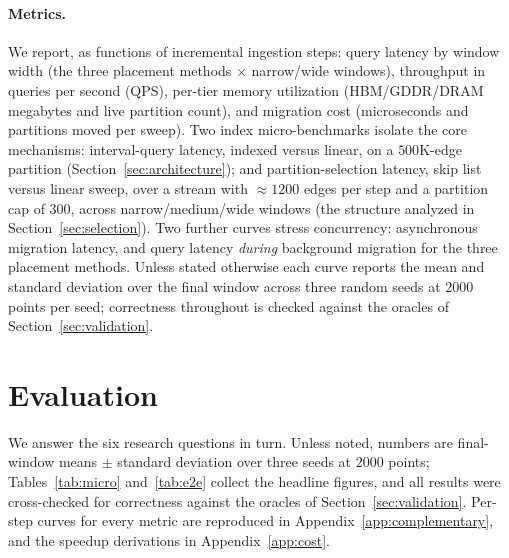 \documentclass[10pt]{article}
\theoremstyle{definition}
\begin{document}
\paragraph{Metrics.}
We report, as functions of incremental ingestion steps: query latency by window
width (the three placement methods $\times$ narrow/wide windows), throughput in
queries per second (QPS), per-tier memory utilization (HBM/GDDR/DRAM megabytes and
live partition count), and migration cost (microseconds and partitions moved per
sweep). Two index micro-benchmarks isolate the core mechanisms: interval-query
latency, indexed versus linear, on a $500$K-edge partition
(Section~\ref{sec:architecture}); and partition-selection latency, skip list versus
linear sweep, over a stream with $\approx 1200$ edges per step and a partition cap
of $300$, across narrow/medium/wide windows (the structure analyzed in
Section~\ref{sec:selection}). Two further curves stress concurrency: asynchronous
migration latency, and query latency \emph{during} background migration for the
three placement methods. Unless stated otherwise each curve reports the mean and
standard deviation over the final window across three random seeds at $2000$ points
per seed; correctness throughout is checked against the oracles of
Section~\ref{sec:validation}.

\section{Evaluation}
\label{sec:evaluation}

We answer the six research questions in turn. Unless noted, numbers are
final-window means $\pm$ standard deviation over three seeds at $2000$ points;
Tables~\ref{tab:micro} and~\ref{tab:e2e} collect the headline figures, and all
results were cross-checked for correctness against the oracles of
Section~\ref{sec:validation}. Per-step curves for every metric are reproduced in
Appendix~\ref{app:complementary}, and the speedup derivations in
Appendix~\ref{app:cost}.
\end{document}
